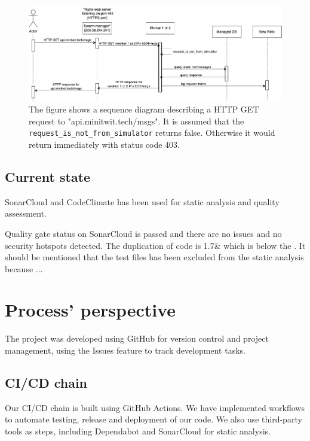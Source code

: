 \documentclass{article}
\begin{document}
\begin{figure}[H]
    \centering
    \includegraphics[width=\textwidth]{images/api-sequence.png}
    \caption{The figure shows a sequence diagram describing a HTTP GET request to "api.minitwit.tech/msgs". It is assumed that the \texttt{request\_is\_not\_from\_simulator} returns false. Otherwise it would return immediately with status code 403.}
    \label{fig:sequence_api}
\end{figure}


\subsection{Current state}
SonarCloud and CodeClimate has been used for static analysis and quality assessment. 

Quality gate status on SonarCloud is passed and there are no issues and no security hotspots detected. The duplication of code is 1.7\& which is below the . It should be mentioned that the test files has been excluded from the static analysis because ... 


\section{Process' perspective}
The project was developed using GitHub for version control and project management, using the Issues feature to track development tasks.


\subsection{CI/CD chain}
Our CI/CD chain is built using GitHub Actions. We have implemented workflows to automate testing, release and deployment of our code. We also use third-party tools as steps, including Dependabot and SonarCloud for static analysis.
\end{document}
